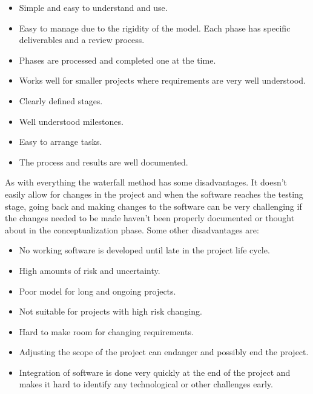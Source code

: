 \begin{itemize}
    \item Simple and easy to understand and use.\cite{SDLC_Waterfall_Model}
    \item Easy to manage due to the rigidity of the model. Each phase has specific deliverables and a review process.\cite{SDLC_Waterfall_Model}
    \item Phases are processed and completed one at the time.\cite{SDLC_Waterfall_Model}
    \item Works well for smaller projects where requirements are very well understood.\cite{SDLC_Waterfall_Model}
    \item Clearly defined stages.\cite{SDLC_Waterfall_Model}
    \item Well understood milestones.\cite{SDLC_Waterfall_Model}
    \item Easy to arrange tasks.\cite{SDLC_Waterfall_Model}
    \item The process and results are well documented.\cite{SDLC_Waterfall_Model}
\end{itemize}
As with everything the waterfall method has some disadvantages. It doesn't easily allow for changes in the project and when the software reaches the testing stage, going back and making changes to the software can be very challenging if the changes needed to be made haven't been properly documented or thought about in the conceptualization phase\cite{seguetech_waterfall_vs_agile}. Some other disadvantages are:
\begin{itemize}
    \item No working software is developed until late in the project life cycle.\cite{SDLC_Waterfall_Model}
    \item High amounts of risk and uncertainty.\cite{SDLC_Waterfall_Model}
    \item Poor model for long and ongoing projects.\cite{SDLC_Waterfall_Model}
    \item Not suitable for projects with high risk changing.\cite{SDLC_Waterfall_Model}
    \item Hard to make room for changing requirements.\cite{SDLC_Waterfall_Model}
    \item Adjusting the scope of the project can endanger and possibly end the project.
    \item Integration of software is done very quickly at the end of the project and makes it hard to identify any technological or other challenges early.
\end{itemize}
